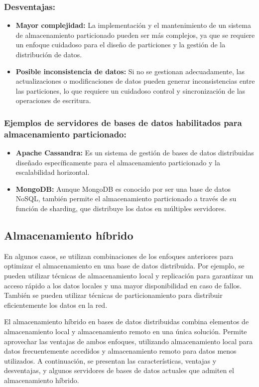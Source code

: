 \subsubsection{Desventajas:}
\noindent
\begin{itemize}
	\item \textbf{Mayor complejidad:} La implementación y el mantenimiento de un sistema de almacenamiento particionado pueden ser más complejos, ya que se requiere un enfoque cuidadoso para el diseño de particiones y la gestión de la distribución de datos.
	\item \textbf{Posible inconsistencia de datos:} Si no se gestionan adecuadamente, las actualizaciones o modificaciones de datos pueden generar inconsistencias entre las particiones, lo que requiere un cuidadoso control y sincronización de las operaciones de escritura.
\end{itemize}

\subsubsection{Ejemplos de servidores de bases de datos habilitados para almacenamiento particionado:}
\noindent
\begin{itemize}
	\item \textbf{Apache Cassandra:} Es un sistema de gestión de bases de datos distribuidas diseñado específicamente para el almacenamiento particionado y la escalabilidad horizontal.
	\item \textbf{MongoDB:} Aunque MongoDB es conocido por ser una base de datos NoSQL, también permite el almacenamiento particionado a través de su función de sharding, que distribuye los datos en múltiples servidores.
\end{itemize}

\subsection{Almacenamiento híbrido}
\noindent
En algunos casos, se utilizan combinaciones de los enfoques anteriores para optimizar el almacenamiento en una base de datos distribuida. Por ejemplo, se pueden utilizar técnicas de almacenamiento local y replicación para garantizar un acceso rápido a los datos locales y una mayor disponibilidad en caso de fallos. También se pueden utilizar técnicas de particionamiento para distribuir eficientemente los datos en la red.

El almacenamiento híbrido en bases de datos distribuidas combina elementos de almacenamiento local y almacenamiento remoto en una única solución. Permite aprovechar las ventajas de ambos enfoques, utilizando almacenamiento local para datos frecuentemente accedidos y almacenamiento remoto para datos menos utilizados. A continuación, se presentan las características, ventajas y desventajas, y algunos servidores de bases de datos actuales que admiten el almacenamiento híbrido.

